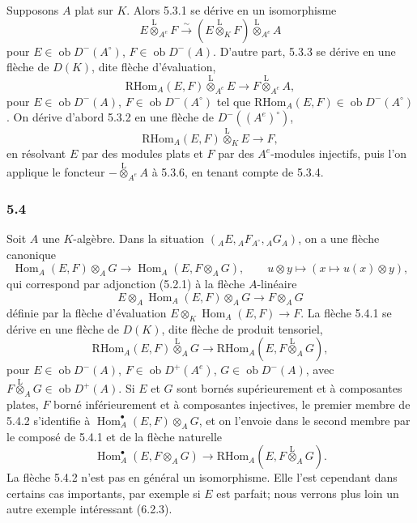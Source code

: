 \documentclass[11pt]{article}
\DeclareMathOperator{\Hom}{Hom}
\newcommand{\ob}{\operatorname{ob}}
\providecommand{\RHom}{\mathrm{RHom}}
\providecommand{\lten}{\overset{\mathrm L}{\otimes}}
\providecommand{\RHom}{\mathrm{RHom}}
\providecommand{\Hom}{\operatorname{Hom}}
\providecommand{\ob}{\operatorname{ob}}
\providecommand{\lten}{\overset{\mathrm L}{\otimes}}
\providecommand{\RHom}{\mathrm R\mathcal{H}om}
\providecommand{\lten}{\overset{\mathrm L}{\otimes}}
\providecommand{\lten}{\overset{\mathrm L}{\otimes}}
\providecommand{\lten}{\overset{\mathrm L}{\otimes}}
\providecommand{\lten}{\overset{\mathrm L}{\otimes}}
\begin{document}
Supposons $A$ plat sur $K$. Alors 5.3.1 se dérive en un isomorphisme
\begin{equation}\tag{5.3.4}
E\lten_{A^e}F\xrightarrow{\sim}(E\lten_KF)\lten_{A^e}A
\end{equation}
pour $E\in\ob D^-(A^\circ)$, $F\in\ob D^-(A)$. D'autre part, 5.3.3 se dérive en une flèche de $D(K)$, dite flèche d'évaluation,
\begin{equation}\tag{5.3.5}
\RHom_A(E,F)\lten_{A^e}E\longrightarrow F\lten_{A^e}A,
\end{equation}
pour $E\in\ob D^-(A)$, $F\in\ob D^-(A^\circ)$ tel que $\RHom_A(E,F)\in\ob D^-(A^\circ)$. On dérive d'abord 5.3.2 en une flèche de $D^-((A^e)^\circ)$,
\begin{equation}\tag{5.3.6}
\RHom_A(E,F)\lten_KE\longrightarrow F,
\end{equation}
en résolvant $E$ par des modules plats et $F$ par des $A^e$-modules injectifs, puis l'on applique le foncteur $-\lten_{A^e}A$ à 5.3.6, en tenant compte de 5.3.4.

\subsubsection*{5.4}

Soit $A$ une $K$-algèbre. Dans la situation $({}_AE,{}_AF_{A^\circ},{}_AG_A)$, on a une flèche canonique
\begin{equation}\tag{5.4.1}
\Hom_A(E,F)\otimes_AG\longrightarrow\Hom_A(E,F\otimes_AG),
\qquad u\otimes y\longmapsto(x\longmapsto u(x)\otimes y),
\end{equation}
qui correspond par adjonction (5.2.1) à la flèche $A$-linéaire
\[
E\otimes_A\Hom_A(E,F)\otimes_AG\longrightarrow F\otimes_AG
\]
définie par la flèche d'évaluation $E\otimes_K\Hom_A(E,F)\to F$. La flèche 5.4.1 se dérive en une flèche de $D(K)$, dite flèche de produit tensoriel,
\begin{equation}\tag{5.4.2}
\RHom_A(E,F)\lten_AG\longrightarrow\RHom_A(E,F\lten_AG),
\end{equation}
pour $E\in\ob D^-(A)$, $F\in\ob D^+(A^e)$, $G\in\ob D^-(A)$, avec $F\lten_AG\in\ob D^+(A)$. Si $E$ et $G$ sont bornés supérieurement et à composantes plates, $F$ borné inférieurement et à composantes injectives, le premier membre de 5.4.2 s'identifie à $\Hom_A^\bullet(E,F)\otimes_AG$, et on l'envoie dans le second membre par le composé de 5.4.1 et de la flèche naturelle
\[
\Hom_A^\bullet(E,F\otimes_AG)\longrightarrow \RHom_A(E,F\lten_AG).
\]
La flèche 5.4.2 n'est pas en général un isomorphisme. Elle l'est cependant dans certains cas importants, par exemple si $E$ est parfait; nous verrons plus loin un autre exemple intéressant (6.2.3).
\end{document}
